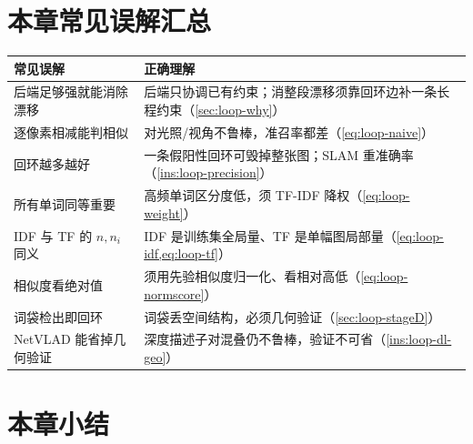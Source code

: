 \section*{本章常见误解汇总}
\begin{table}[H]\centering\small
\begin{tabular}{p{} p{}}
\toprule
\textbf{常见误解} & \textbf{正确理解} \\
\midrule
后端足够强就能消除漂移 & 后端只协调已有约束；消整段漂移须靠回环边补一条长程约束（\cref{sec:loop-why}）\\
逐像素相减能判相似 & 对光照/视角不鲁棒，准召率都差（\cref{eq:loop-naive}）\\
回环越多越好 & 一条假阳性回环可毁掉整张图；SLAM 重准确率（\cref{ins:loop-precision}）\\
所有单词同等重要 & 高频单词区分度低，须 TF-IDF 降权（\cref{eq:loop-weight}）\\
IDF 与 TF 的 $n,n_i$ 同义 & IDF 是训练集全局量、TF 是单幅图局部量（\cref{eq:loop-idf,eq:loop-tf}）\\
相似度看绝对值 & 须用先验相似度归一化、看相对高低（\cref{eq:loop-normscore}）\\
词袋检出即回环 & 词袋丢空间结构，必须几何验证（\cref{sec:loop-stageD}）\\
NetVLAD 能省掉几何验证 & 深度描述子对混叠仍不鲁棒，验证不可省（\cref{ins:loop-dl-geo}）\\
\bottomrule
\end{tabular}
\end{table}

\section*{本章小结}

